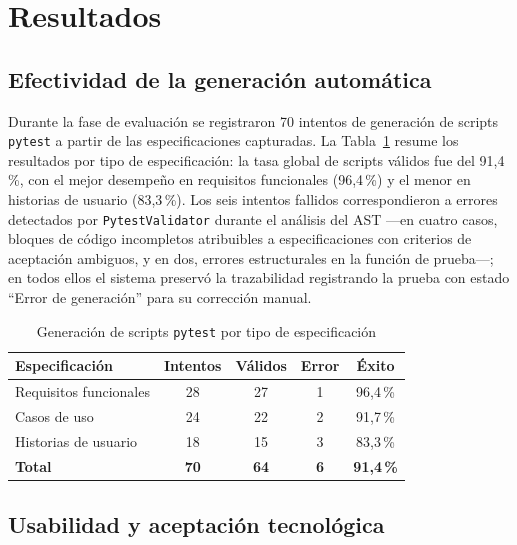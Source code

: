 \documentclass[10pt,journal,twoside,letterpaper]{IEEEtran}
\begin{document}
	\section{Resultados}
	\label{sec:resultados}

	\subsection{Efectividad de la generación automática}
	\label{subsec:generacion}

	Durante la fase de evaluación se registraron 70 intentos de generación de scripts \texttt{pytest} a partir de las especificaciones capturadas. La Tabla~\ref{tab:generacion} resume los resultados por tipo de especificación: la tasa global de scripts válidos fue del 91,4\,\%, con el mejor desempeño en requisitos funcionales (96,4\,\%) y el menor en historias de usuario (83,3\,\%). Los seis intentos fallidos correspondieron a errores detectados por \texttt{PytestValidator} durante el análisis del AST ---en cuatro casos, bloques de código incompletos atribuibles a especificaciones con criterios de aceptación ambiguos, y en dos, errores estructurales en la función de prueba---; en todos ellos el sistema preservó la trazabilidad registrando la prueba con estado ``Error de generación'' para su corrección manual.

	\begin{table}[!tb]
		\caption{Generación de scripts \texttt{pytest} por tipo de especificación}
		\label{tab:generacion}
		\centering
		\small
		\begin{tabular}{@{}lcccc@{}}
			\toprule
			\textbf{Especificación} & \textbf{Intentos} & \textbf{Válidos} & \textbf{Error} & \textbf{Éxito} \\
			\midrule
			Requisitos funcionales & 28 & 27 & 1 & 96,4\,\% \\
			Casos de uso           & 24 & 22 & 2 & 91,7\,\% \\
			Historias de usuario   & 18 & 15 & 3 & 83,3\,\% \\
			\midrule
			\textbf{Total}         & \textbf{70} & \textbf{64} & \textbf{6} & \textbf{91,4\,\%} \\
			\bottomrule
		\end{tabular}
	\end{table}

	\subsection{Usabilidad y aceptación tecnológica}
	\label{subsec:sustam}
\end{document}
